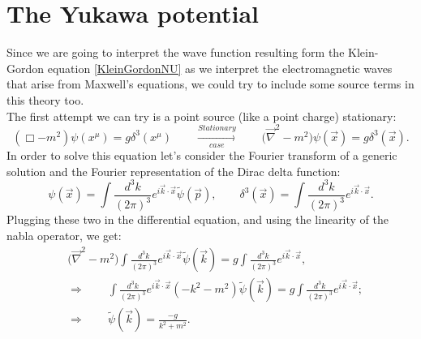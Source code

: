 \section{The Yukawa potential}
Since we are going to interpret the wave function resulting form the Klein-Gordon equation \eqref{KleinGordonNU} as we interpret the electromagnetic waves that arise from Maxwell's equations, we could try to include some source terms in this theory too.\\
The first attempt we can try is a point source (like a point charge) stationary:
\begin{equation*}
    (\Box-m^2)\psi(x^\mu)=g\delta^3(x^\mu)\qquad\xrightarrow[case]{Stationary}\qquad\big(\vec \nabla^2-m^2\big)\psi(\vec x)=g\delta^3(\vec x).
\end{equation*}
In order to solve this equation let's consider the Fourier transform of a generic solution and the Fourier representation of the Dirac delta function:
\begin{equation*}
    \psi(\vec x)=\int\frac{d^3k}{(2\pi)^3}e^{i\vec k\cdot \vec x } \tilde{\psi}(\vec p),\qquad \delta^3(\vec x)=\int\frac{d^3k}{(2\pi)^3}e^{i\vec k\cdot \vec x }.
\end{equation*}
Plugging these two in the differential equation, and using the linearity of the nabla operator, we get: 
\begin{align*}
    &\big(\vec \nabla^2-m^2\big)\int\frac{d^3k}{(2\pi)^3}e^{i\vec k\cdot \vec x } \tilde{\psi}(\vec k)=g\int\frac{d^3k}{(2\pi)^3}e^{i\vec k\cdot \vec x },\\&\Rightarrow\qquad\int\frac{d^3k}{(2\pi)^3}e^{i\vec k\cdot \vec x }(-k^2-m^2) \tilde{\psi}(\vec k)=g\int\frac{d^3k}{(2\pi)^3}e^{i\vec k\cdot \vec x };\\&\Rightarrow\qquad \tilde{\psi}(\vec k)=\frac{-g}{k^2+m^2}.
\end{align*}
